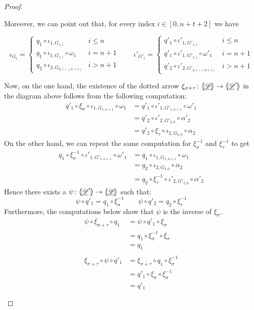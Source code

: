 \documentclass[a4paper]{article}
\newcommand{\dder}[1]{\mathscr{#1}}
\newcommand{\der}[1]{\underline{\dder{#1}}}
\newcommand{\lpro}{\langle \hspace{-1.85pt}[}
\newcommand{\rpro}{]\hspace{-1.85pt}\rangle}
\newcommand{\tpro}[1]{\lpro \der{#1}\rpro}
\theoremstyle{definition}
\begin{document}
\begin{proof}
\begin{itemize}
Moreover, we can point out that, for every index $i\in [0,n+t+2]$ we have

\[\iota_{G_i}=\begin{cases}q_1\circ \iota_{1, G_{1,i}} & i \leq n\\
	q_1\circ \iota_{1, G_{1, i}}\circ \omega_1& i=n+1\\
	q_2\circ \iota_{2, G_{2,i-(n+1)}} & i > n+1 
\end{cases} \qquad \iota'_{G'_i}=\begin{cases}q'_1\circ \iota'_{1, G'_{1,i}} & i \leq n\\
	q'_1\circ \iota'_{1, G'_{1, i}}\circ \omega'_1& i=n+1\\
	q'_2\circ \iota'_{2, G'_{2,i-(n+1)}} & i > n+1 
\end{cases}\]

Now, on the one hand, the existence of the dotted arrow $\xi_{\sigma+\tau}\colon \tpro{D}\to \lpro \der{D}'\rpro$ in the diagram above follows from the following computation:
\begin{align*}
	q'_1\circ \xi_\sigma \circ \iota_{1, G_{1,n+1}} \circ \omega_1&=q'_1\circ \iota'_{1,G'_{1, n+1}} \circ \omega'_1\\&= q'_2 \circ \iota'_{2, G'_{2,0}} \circ \alpha'_2\\&=q'_2\circ \xi_\tau \circ \iota_{2, G_{2,0}} \circ \alpha_2
\end{align*} 
On the other hand, we can repeat the same computation for $\xi^{-1}_\sigma$ and $\xi^{-1}_\tau$ to get
\begin{align*}
	q_1\circ \xi^{-1}_\sigma \circ \iota'_{1, G'_{1,n+1}} \circ \omega'_1&=q_1\circ \iota_{1,G_{1, n+1}} \circ \omega_1\\&= q_2 \circ \iota_{2, G_{2,0}} \circ \alpha_2\\&=q_2\circ \xi^{-1}_\tau \circ \iota'_{2, G'_{2,0}} \circ \alpha'_2
\end{align*} 
Hence there exists a $\psi\colon \lpro \der{D}'\rpro \to \tpro{D}$ such that:
\[\psi \circ q'_1=q_1\circ \xi^{-1}_\sigma \qquad \psi \circ q'_2=q_2\circ \xi^{-1}_\tau\]
Furthermore, the computations below show that $\psi$ is the inverse of $\xi_\sigma$.
\[\begin{split}
	\psi \circ \xi_{\sigma+\tau}\circ  q_1&=\psi \circ q'_1\circ \xi_\sigma \\&=q_1\circ \xi^{-1}_{\sigma}\circ \xi_\sigma\\&=q_1\\\\
	\xi_{\sigma+\tau}\circ \psi \circ q'_1&=\xi_{\sigma+\tau}\circ q_1\circ \xi^{-1}_\sigma \\&=q'_1\circ \xi_{\sigma}\circ \xi^{-1}_\sigma\\&=q'_1

\end{split}\]
\end{itemize}
\end{proof}
\end{document}

